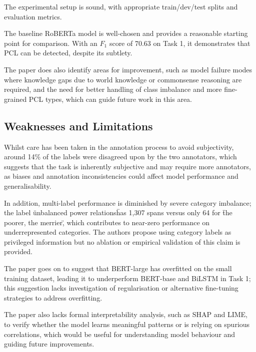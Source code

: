 \documentclass[11pt,a4paper]{article}
\begin{document}
The experimental setup is sound, with appropriate train/dev/test splits and
evaluation metrics.

The baseline RoBERTa model is well-chosen and provides a reasonable starting
point for comparison. With an $F_1$ score of 70.63 on Task 1, it demonstrates
that PCL can be detected, despite its subtlety.

The paper does also identify areas for improvement, such as model failure modes
where knowledge gaps due to world knowledge or commonsense reasoning are
required, and the need for better handling of class imbalance and more
fine-grained PCL types, which can guide future work in this area\@.


\subsection{Weaknesses and Limitations}

Whilst care has been taken in the annotation process to avoid subjectivity,
around 14\% of the labels were disagreed upon by the two annotators, which
suggests that the task is inherently subjective and may require more annotators,
as biases and annotation inconsistencies could affect model performance and
generalisability.

In addition, multi-label performance is diminished by severe category imbalance;
the label \"unbalanced power relations\" has 1,307 spans versus only 64 for
\"the poorer, the merrier\", which contributes to near-zero performance on
underrepresented categories. The authors propose using category labels as
privileged information but no ablation or empirical validation of this claim is
provided.

The paper goes on to suggest that BERT-large has overfitted on the small
training dataset, leading it to underperform BERT-base and BiLSTM in Task 1;
this suggestion lacks investigation of regularisation or alternative fine-tuning
strategies to address overfitting.

The paper also lacks formal interpretability analysis, such as SHAP and LIME, to
verify whether the model learns meaningful patterns or is relying on spurious
correlations, which would be useful for understanding model behaviour and
guiding future improvements\@.

\end{document}

